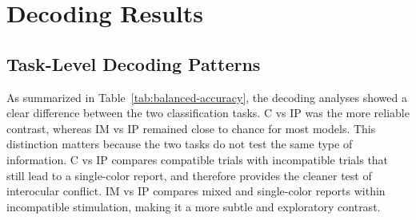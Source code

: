 \documentclass[11pt,a4paper,chapterprefix=false,parskip=false]{scrreprt}
\newcommand{\atc}[1]{\textcolor{red}{#1}}
\begin{document}



\chapter{Decoding Results}
\label{chap:results}

\section{Task-Level Decoding Patterns}

As summarized in Table~\ref{tab:balanced-accuracy}, the decoding analyses showed a clear difference between the two classification tasks. C vs IP was the more reliable contrast, whereas IM vs IP remained close to chance for most models. This distinction matters because the two tasks do not test the same type of information. C vs IP compares compatible trials with incompatible trials that still lead to a single-color report, and therefore provides the cleaner test of interocular conflict. IM vs IP compares mixed and single-color reports within incompatible stimulation, making it a more subtle and exploratory contrast.
\end{document}
